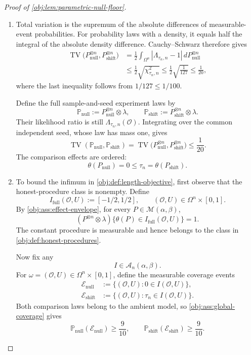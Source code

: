 \begin{proof}[Proof of \cref{obj:lem:parametric-null-floor}]
\begin{enumerate}
\item Total variation is the supremum of the absolute differences of measurable-event probabilities. For probability laws with a density, it equals half the integral of the absolute density difference. Cauchy--Schwarz therefore gives
\[
\begin{aligned}
\operatorname{TV}
\bigl(P_{\mathrm{null}}^{\otimes n},
      P_{\mathrm{shift}}^{\otimes n}\bigr)
&=
\frac12
\int_{\Omega^n}|\Lambda_{\tau_n,n}-1|
\,dP_{\mathrm{null}}^{\otimes n}\\
&\le
\frac12\sqrt{\chi^2_{\tau_n,n}}
\le
\frac12\sqrt{\frac1{127}}
\le
\frac1{20},
\end{aligned}
\]
where the last inequality follows from \(1/127\le1/100\).

Define the full sample-and-seed experiment laws by
\[
\mathbb P_{\mathrm{null}}
:=
P_{\mathrm{null}}^{\otimes n}\otimes\lambda,
\qquad
\mathbb P_{\mathrm{shift}}
:=
P_{\mathrm{shift}}^{\otimes n}\otimes\lambda.
\]
Their likelihood ratio is still \(\Lambda_{\tau_n,n}(\mathcal O)\). Integrating over the common independent seed, whose law has mass one, gives
\[
\operatorname{TV}
(\mathbb P_{\mathrm{null}},\mathbb P_{\mathrm{shift}})
=
\operatorname{TV}
\bigl(P_{\mathrm{null}}^{\otimes n},
      P_{\mathrm{shift}}^{\otimes n}\bigr)
\le\frac1{20}.
\]
The comparison effects are ordered:
\[
\theta(P_{\mathrm{null}})
=0
\le\tau_n
=\theta(P_{\mathrm{shift}}).
\]

\item To bound the infimum in \cref{obj:def:length-objective}, first observe that the honest-procedure class is nonempty. Define
\[
I_{\mathrm{full}}(\mathcal O,U):=[-1/2,1/2],
\qquad
(\mathcal O,U)\in\Omega^n\times[0,1].
\]
By \cref{obj:ass:effect-envelope}, for every
\(P\in\mathcal M(\alpha,\beta)\),
\[
(P^{\otimes n}\otimes\lambda)
\{\theta(P)\in I_{\mathrm{full}}(\mathcal O,U)\}=1.
\]
The constant procedure is measurable and hence belongs to the class in
\cref{obj:def:honest-procedures}.

Now fix any
\[
I\in\mathcal A_n(\alpha,\beta).
\]
For
\(\omega=(\mathcal O,U)\in\Omega^n\times[0,1]\), define the measurable coverage events
\[
\begin{aligned}
\mathcal E_{\mathrm{null}}
&:=
\{(\mathcal O,U):0\in I(\mathcal O,U)\},\\
\mathcal E_{\mathrm{shift}}
&:=
\{(\mathcal O,U):\tau_n\in I(\mathcal O,U)\}.
\end{aligned}
\]
Both comparison laws belong to the ambient model, so
\cref{obj:ass:global-coverage} gives
\[
\mathbb P_{\mathrm{null}}(\mathcal E_{\mathrm{null}})
\ge\frac9{10},
\qquad
\mathbb P_{\mathrm{shift}}(\mathcal E_{\mathrm{shift}})
\ge\frac9{10}.
\]


\end{enumerate}
\end{proof}
